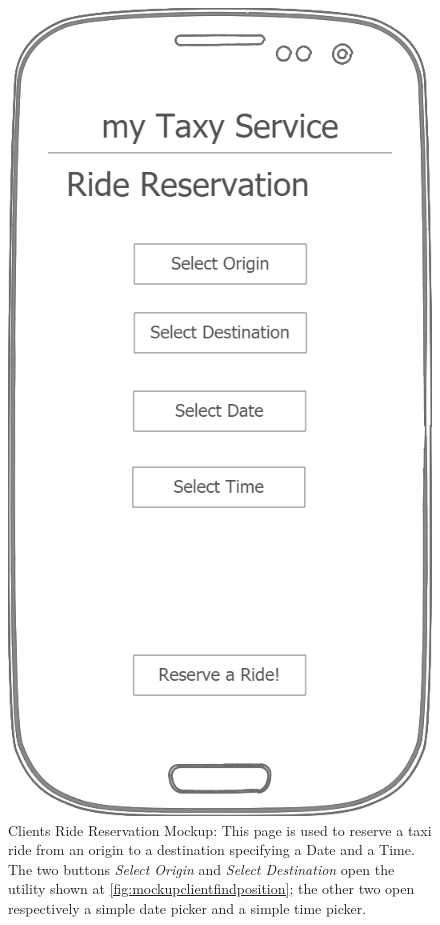 \documentclass[a4paper]{article}
\begin{document}
\begin{enumerate}[label=\bfseries G\arabic*:]
\begin{figure}[H]
\includegraphics[width=\mockupWidth]{Mockup-ClientsRideReservation}
\centering
\caption[Clients Ride Reservation Mockup]{Clients Ride Reservation Mockup: \newline This page is used to reserve a taxi ride from an origin to a destination specifying a Date and a Time. The two buttons \emph{Select Origin} and \emph{Select Destination} open the utility shown at \autoref{fig:mockupclientfindposition}; the other two open respectively a simple date picker and a simple time picker.}
\label{fig:mockupclientridereservation}
\end{figure}


\end{enumerate}
\end{document}
